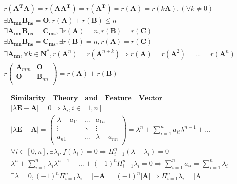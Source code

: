 \documentclass{article}
\begin{document}
\begin{align*}
    r(\mathbf{A^{\mathbf{T}}A}) = r(\mathbf{AA^{\mathbf{T}}}) = r(\mathbf{A}^{\mathbf{T}}) = r(\mathbf{A}) = r(k\mathbf{A}),(\forall k \neq 0)\\
    \exists \mathbf{A_{mn}B_{ns}} = \mathbf{O},r(\mathbf{A})+r(\mathbf{B}) \le n \\ 
    \exists \mathbf{A_{mn}B_{ns}} = \mathbf{C_{ms}},\exists r(\mathbf{A})=n, r(\mathbf{B}) = r(\mathbf{C}) \\ 
    \exists \mathbf{A_{mn}B_{ns}} = \mathbf{C_{ms}},\exists r(\mathbf{B})=n, r(\mathbf{A}) = r(\mathbf{C}) \\
    \exists \mathbf{A_{nn}},\forall k \in \mathbf{N^{*}} ,r(\mathbf{A}^{n}) = r(\mathbf{A}^{n+k}) \Longrightarrow  r(\mathbf{A}) = r(\mathbf{A}^{2}) = ... =  r(\mathbf{A}^{n}) \\
    r\left(
        \begin{array}{ccc}
            \mathbf{A}_{mm} & \mathbf{O} \\ 
            \mathbf{O} & \mathbf{B}_{nn} \\ 
        \end{array} 
    \right) = r(\mathbf{A})+r({\mathbf{B}}) 
\end{align*}
\clearpage

\begin{align*}
    \bm{Similarity \quad Theory \quad and \quad Feature \quad Vector} \\ 
    |\lambda\mathbf{E}-\mathbf{A}| = 0 \Rightarrow \lambda_{i},i \in [1,n] \\ 
    |\lambda\mathbf{E}-\mathbf{A}| = \left( 
        \begin{array}{ccc}
            \lambda-a_{11} & ... & a_{1n} \\  
            \vdots & \ddots & \vdots \\ 
            a_{n1} & ... & \lambda-a_{nn} \\ 
        \end{array}  
    \right) = \lambda^{n}+\sum_{i=1}^{n}a_{ii}\lambda^{n-1}+...\\ 
    \forall i\in [0,n],\exists \lambda_{i},f(\lambda_{i})=0 \Longrightarrow \Pi_{i=1}^{n}(\lambda-\lambda_{i}) = 0 \\ 
    \lambda^{n}+\sum_{i=1}^{n}\lambda_{i}\lambda^{n-1}+...+ (-1)^{n}\Pi_{i=1}^{n}\lambda_{i} = 0 \Rightarrow \sum_{i=1}^{n}a_{ii} = \sum_{i=1}^{n}\lambda_{i} \\
    \exists \lambda = 0, (-1)^{n}\Pi_{i=1}^{n}\lambda_{i}=|-\mathbf{A}|=(-1)^{n}|\mathbf{A}| \Rightarrow\Pi_{i=1}^{n}\lambda_{i} = |\mathrm{A}| \\ 
\end{align*}
\end{document}
